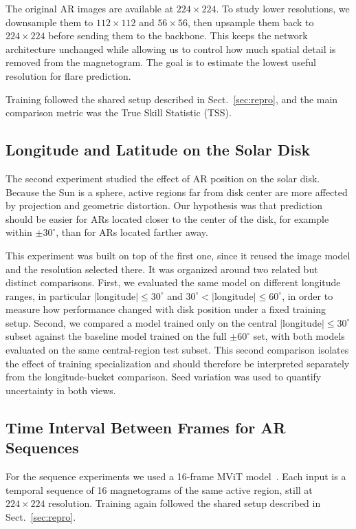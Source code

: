 \documentclass[runningheads]{llncs}
\begin{document}
The original AR images are available at $224 \times 224$. To study lower resolutions, we downsample them to $112 \times 112$ and $56 \times 56$, then upsample them back to $224 \times 224$ before sending them to the backbone. This keeps the network architecture unchanged while allowing us to control how much spatial detail is removed from the magnetogram. The goal is to estimate the lowest useful resolution for flare prediction.

Training followed the shared setup described in Sect.~\ref{sec:repro}, and the main comparison metric was the True Skill Statistic (TSS).

\subsection{Longitude and Latitude on the Solar Disk}

The second experiment studied the effect of AR position on the solar disk. Because the Sun is a sphere, active regions far from disk center are more affected by projection and geometric distortion. Our hypothesis was that prediction should be easier for ARs located closer to the center of the disk, for example within $\pm 30^\circ$, than for ARs located farther away.

This experiment was built on top of the first one, since it reused the image model and the resolution selected there. It was organized around two related but distinct comparisons. First, we evaluated the same model on different longitude ranges, in particular $|$longitude$| \leq 30^\circ$ and $30^\circ < |$longitude$| \leq 60^\circ$, in order to measure how performance changed with disk position under a fixed training setup. Second, we compared a model trained only on the central $|$longitude$| \leq 30^\circ$ subset against the baseline model trained on the full $\pm 60^\circ$ set, with both models evaluated on the same central-region test subset. This second comparison isolates the effect of training specialization and should therefore be interpreted separately from the longitude-bucket comparison. Seed variation was used to quantify uncertainty in both views.

\subsection{Time Interval Between Frames for AR Sequences}

For the sequence experiments we used a 16-frame MViT model~\cite{ref_mvit}. Each input is a temporal sequence of 16 magnetograms of the same active region, still at $224 \times 224$ resolution. Training again followed the shared setup described in Sect.~\ref{sec:repro}.
\end{document}
